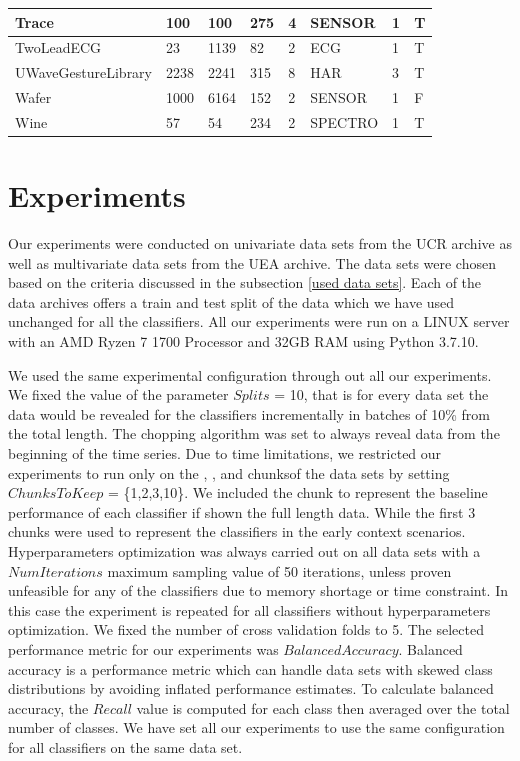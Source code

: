 \begin{landscape}
\begin{longtable}{|*{8}l|}
        \hline
        Trace & 100 & 100 & 275 & 4 & SENSOR & 1 & T \\[1ex]
        \hline
        TwoLeadECG & 23 & 1139 & 82 & 2 & ECG & 1 & T \\[1ex]
        \hline
        UWaveGestureLibrary & 2238 & 2241 & 315 & 8 & HAR & 3 & T \\[1ex]
        \hline
        Wafer & 1000 & 6164 & 152 & 2 & SENSOR & 1 & F \\[1ex]
        \hline
        Wine & 57 & 54 & 234 & 2 & SPECTRO & 1 & T \\
        \hline
    \end{longtable}
\end{landscape}



\section{Experiments}
\label{SectionExperiment}
Our experiments were conducted on univariate data sets from the UCR archive as well as multivariate data sets from the UEA archive.
The data sets were chosen based on the criteria discussed in the subsection \ref{used data sets}.
Each of the data archives offers a train and test split of the data which we have used unchanged for all the classifiers.
All our experiments were run on a LINUX server with an AMD Ryzen 7 1700 Processor and 32GB RAM using Python 3.7.10.

We used the same experimental configuration through out all our experiments.
We fixed the value of the parameter $Splits$ = 10, that is for every data set the data would be revealed for the classifiers incrementally in batches of 10\% from the total length.
The chopping algorithm was set to always reveal data from the beginning of the time series.
Due to time limitations, we restricted our experiments to run only on the , ,  and  chunksof the data sets by setting $ChunksToKeep$ = \{1,2,3,10\}.
We included the  chunk to represent the baseline performance of each classifier if shown the full length data.
While the first 3 chunks were used to represent the classifiers in the early context scenarios.
Hyperparameters optimization was always carried out on all data sets with a $NumIterations$ maximum sampling value of 50 iterations, unless proven unfeasible for any of the classifiers due to memory shortage or time constraint.
In this case the experiment is repeated for all classifiers without hyperparameters optimization. We fixed the number of cross validation folds to 5.
The selected performance metric for our experiments was $Balanced Accuracy$.
Balanced accuracy is a performance metric which can handle data sets with skewed class distributions by avoiding inflated performance estimates.
To calculate balanced accuracy, the $Recall$ value is computed for each class then averaged over the total number of classes.
We have set all our experiments to use the same configuration for all classifiers on the same data set.


